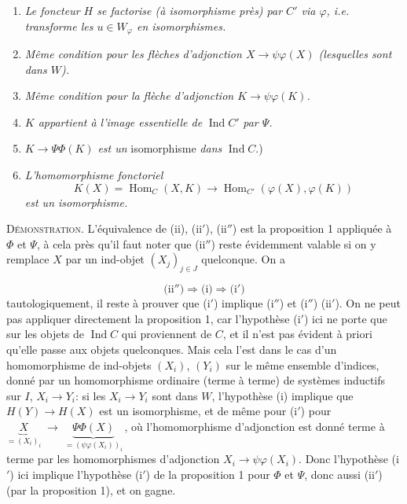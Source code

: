 \documentclass[11pt]{article}
\newcommand{\printedpage}[1]{\marginpar{\footnotesize p.~#1}}
\newcommand{\msp}[1]{\marginpar{\footnotesize [#1]}}
\newcommand{\Hom}{\operatorname{Hom}}
\newcommand{\Ind}{\operatorname{Ind}}
\begin{document}
\begin{enumerate}[label={}]
\item[(i)] \textit{Le foncteur $H$ se factorise (à isomorphisme près) par $C'$ via $\varphi$, i.e. transforme les $u \in W_\varphi$ en isomorphismes.}
\printedpage{27}
\item[(i$'$)] \textit{Même condition pour les flèches d'adjonction $X \longrightarrow \psi\varphi(X)$ (lesquelles sont dans $W$).}
\item[(i$''$)] \textit{Même condition pour la flèche d'adjonction $K \longrightarrow \psi\varphi(K)$.}
\item[(ii)] \textit{$K$ appartient à l'image essentielle de} $\Ind C'$ \textit{par $\Psi$.}
\item[(ii$'$)] $K \longrightarrow \Psi\Phi(K)$ \textit{est un} isomorphisme \textit{dans} $\Ind C$.) %
\item[(ii$''$)] \textit{L'homomorphisme fonctoriel}
\[
K(X) = \Hom_C(X,K) \longrightarrow \Hom_{C'}(\varphi(X),\varphi(K))
\]
 \textit{est un isomorphisme.}
\end{enumerate}

\textsc{Démonstration.} L'équivalence de (ii), (ii$'$), (ii$''$) est la proposition 1 appliquée à $\Phi$ et $\Psi$, à cela près qu'il faut noter que (ii$''$) reste évidemment valable si on y remplace $X$ par un ind-objet $(X_j)_{j\in J}$ quelconque. On a

\noindent\msp{page 42}%
\[
\text{(ii$''$)} \Longrightarrow \text{(i)} \Longrightarrow \text{(i$'$)}
\]
tautologiquement, il reste à prouver que (i$'$) implique (i$''$) et (i$''$) (ii$'$). On ne peut pas appliquer directement la proposition 1, car l'hypothèse (i$'$) ici ne porte que sur les objets de $\Ind C$ qui proviennent de $C$, et il n'est pas évident à priori qu'elle passe aux objets quelconques. Mais cela l'est dans le cas d'un homomorphisme de ind-objets $(X_i)$, $(Y_i)$ sur le même ensemble d'indices, donné par un homomorphisme ordinaire (terme à terme) de systèmes inductifs sur $I$, $X_i \longrightarrow Y_i$: si les $X_i \longrightarrow Y_i$ sont dans $W$, l'hypothèse (i) implique que $H(Y) \longrightarrow H(X)$ est un isomorphisme, et de même pour (i$'$) pour $\underbrace{X}_{=(X_i)_i} \;\longrightarrow\; \underbrace{\Psi\Phi(X)}_{=(\psi\varphi(X_i))_i}$\,, où l'homomorphisme d'adjonction est donné terme à terme par les homomorphismes d'adjonction $X_i \longrightarrow \psi\varphi(X_i)$. Donc l'hypothèse (i$'$) ici implique l'hypothèse (i$'$) de la proposition 1 pour $\Phi$ et $\Psi$, donc aussi (ii$'$) (par la proposition 1), et on gagne. %
\end{document}
